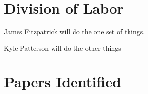 \documentclass[pdftex,12pt,letter]{article}
\begin{document}
\section{Division of Labor}
James Fitzpatrick will do the one set of things. 

Kyle Patterson will do the other things


\section{Papers Identified}

\FloatBarrier
\end{document}
